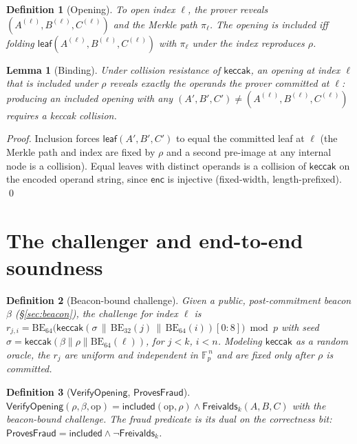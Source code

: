\documentclass[11pt]{article}
\newtheorem{lemma}[theorem]{Lemma}
\newtheorem{definition}{Definition}
\newcommand{\Fp}{\mathbb{F}_p}
\newcommand{\keccak}{\mathsf{keccak}}
\begin{document}
\begin{definition}[Opening]
To \emph{open} index $\ell$, the prover reveals $(A^{(\ell)},B^{(\ell)},C^{(\ell)})$ and the Merkle
path $\pi_\ell$. The opening is \emph{included} iff folding $\mathsf{leaf}(A^{(\ell)},B^{(\ell)},C^{(\ell)})$ with
$\pi_\ell$ under the index reproduces $\rho$.
\end{definition}

\begin{lemma}[Binding]\label{lem:binding}
Under collision resistance of $\keccak$, an opening at index $\ell$ that is included under $\rho$
reveals exactly the operands the prover committed at $\ell$: producing an included opening with any
$(A',B',C')\neq(A^{(\ell)},B^{(\ell)},C^{(\ell)})$ requires a keccak collision.
\end{lemma}
\begin{proof}
Inclusion forces $\mathsf{leaf}(A',B',C')$ to equal the committed leaf at $\ell$ (the Merkle path and
index are fixed by $\rho$ and a second pre-image at any internal node is a collision). Equal leaves
with distinct operands is a collision of $\keccak$ on the encoded operand string, since $\mathsf{enc}$
is injective (fixed-width, length-prefixed). \qed
\end{proof}

\section{The challenger and end-to-end soundness}\label{sec:challenger}

\begin{definition}[Beacon-bound challenge]
Given a public, post-commitment beacon $\beta$ (\S\ref{sec:beacon}), the challenge for index $\ell$ is
$r_{j,i} = \mathrm{BE}_{64}\big(\keccak(\sigma \,\|\, \mathrm{BE}_{32}(j) \,\|\, \mathrm{BE}_{64}(i))[0{:}8]\big)\bmod p$
with seed $\sigma=\keccak(\beta\|\rho\|\mathrm{BE}_{64}(\ell))$, for $j<k$, $i<n$. Modeling $\keccak$ as a
random oracle, the $r_j$ are uniform and independent in $\Fp^{\,n}$ and are fixed only \emph{after}
$\rho$ is committed.
\end{definition}

\begin{definition}[$\mathsf{VerifyOpening}$, $\mathsf{ProvesFraud}$]
$\mathsf{VerifyOpening}(\rho,\beta,\text{op}) = \mathsf{included}(\text{op},\rho) \wedge
\mathsf{Freivalds}_k(A,B,C)$ with the beacon-bound challenge. The fraud predicate is its dual on the
correctness bit: $\mathsf{ProvesFraud}=\mathsf{included}\wedge\neg\mathsf{Freivalds}_k$.
\end{definition}
\end{document}
